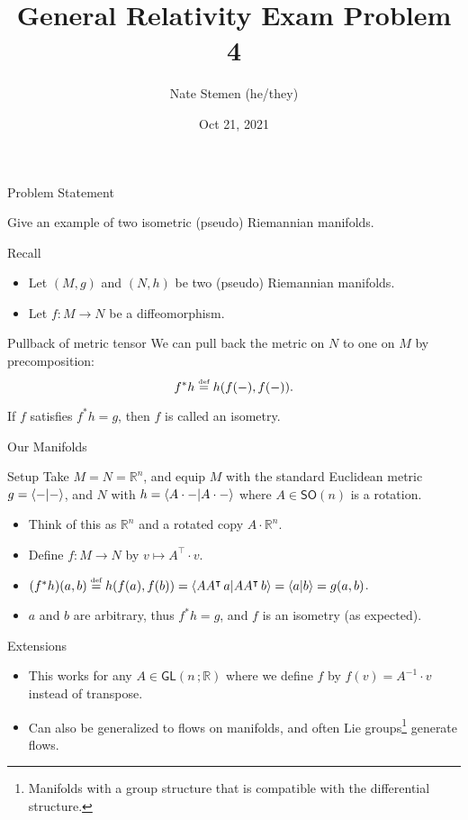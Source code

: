 \documentclass[aspectratio=1610,xcolor=dvipsnames,mathserif]{beamer}
\title{General Relativity Exam Problem 4}
\date{Oct 21, 2021}
\author{Nate Stemen (he/they)}
\institute{AMATH 875}
\newcommand{\R}{\mathbb{R}}
\newcommand{\SO}{\mathsf{SO}}
\newcommand{\GL}[2]{\mathsf{GL}(#1\,;#2)}
\newcommand{\defeq}{\stackrel{\text{\tiny def}}{=}}
\newcommand{\problemstatement}{Give an example of two isometric (pseudo) Riemannian manifolds.}
\begin{document}
\maketitle

\begin{frame}{Problem Statement}
	\large
	\begin{prob}
		\problemstatement
	\end{prob}
\end{frame}

\begin{frame}{Recall}
	\begin{itemize}
		\item Let $(M, g)$ and $(N, h)$ be two (pseudo) Riemannian manifolds.
		\item Let $f:M\to N$ be a diffeomorphism.
	\end{itemize}
	\pause
	\begin{exampleblock}{Pullback of metric tensor}
		We can pull back the metric on $N$ to one on $M$ by precomposition:
		\begin{equation*}
			f^* h \defeq h(f(-), f(-)).
		\end{equation*}
	\end{exampleblock}
	\pause
	\begin{definition}[Isometry]
		If $f$ satisfies $f^*h = g$, then $f$ is called an isometry.
	\end{definition}
\end{frame}

\begin{frame}{Our Manifolds}
	\begin{alertblock}{Setup}
		Take $M = N = \R^n$, and equip $M$ with the standard Euclidean metric $g = \ip{-}{-}$, and $N$ with $h = \ip{A\cdot -}{A\cdot -}$ where $A\in\SO(n)$ is a rotation.
	\end{alertblock}
	\pause
	\begin{itemize}[<+->]
		\item Think of this as $\R^n$ and a rotated copy $A\cdot \R^n$.
		\item Define $f:M\to N$ by $v\mapsto A^\intercal \cdot v$.
		\item $(f^*h)(a, b) \defeq h(f(a), f(b)) = \ip{A A^\intercal\, a}{A A^\intercal\, b} = \ip{a}{b} = g(a, b)$.
		\item $a$ and $b$ are arbitrary, thus $f^* h = g$, and $f$ is an isometry (as expected).
	\end{itemize}
\end{frame}

\begin{frame}{Extensions}
	\begin{itemize}
		\item This works for any $A\in\GL{n}{\R}$ where we define $f$ by $f(v) = A^{-1}\cdot v$ instead of transpose.
		\item Can also be generalized to flows on manifolds, and often Lie groups\footnote{Manifolds with a group structure that is compatible with the differential structure.} generate flows.
	\end{itemize}
\end{frame}
\end{document}
